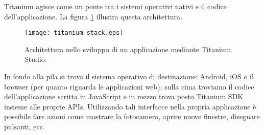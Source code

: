 			Titanium agisce come un ponte tra i sistemi operativi nativi e il 
			codice dell'applicazione. La figura \ref{fig:ti_stack} illustra 
			questa architettura.
			\begin{figure}[h]
				\centering
				\texttt{[image: titanium-stack.eps]}
				\caption{
					Architettura nello sviluppo di un applicazione \crossplat{} 
					mediante Titanium Studio.
				}
				\label{fig:ti_stack}
			\end{figure}
			In fondo alla pila si trova il sistema 
			operativo di destinazione: Android, iOS o il browser (per quanto 
			riguarda le applicazioni web); sulla cima troviamo il codice 
			dell'applicazione scritta in JavaScript e in mezzo trova posto
			Titanium SDK insieme alle proprie APIs. Utilizzando tali interfacce 
			nella propria applicazione è possibile fare azioni come mostrare la 
			fotocamera,	aprire nuove finestre, disegnare pulsanti, ecc. 
			
